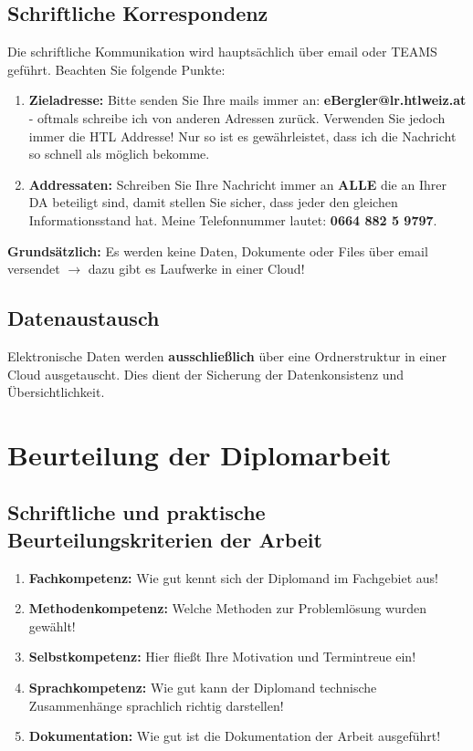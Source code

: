 \documentclass[a4paper, 12pt, xcolor=dvipsnames]{scrartcl}	%
\begin{document}
\subsection{Schriftliche Korrespondenz}								%
Die schriftliche Kommunikation wird hauptsächlich über email oder TEAMS geführt. Beachten Sie folgende Punkte:
\begin{enumerate}																%
\item\textbf{Zieladresse:} Bitte senden Sie Ihre mails immer an: \textbf{eBergler@lr.htlweiz.at} - oftmals schreibe ich von anderen Adressen zurück. Verwenden Sie jedoch immer die HTL Addresse! Nur so ist es gewährleistet, dass ich die Nachricht so schnell als möglich bekomme.
\item\textbf{Addressaten:} Schreiben Sie Ihre Nachricht immer an \textbf{ALLE} die an Ihrer DA beteiligt sind, damit stellen Sie sicher, dass jeder den gleichen Informationsstand hat. Meine Telefonnummer lautet: \textbf{0664 882 5 9797}.
\end{enumerate}
\textbf{Grundsätzlich:} Es werden keine Daten, Dokumente oder Files über email versendet $\to$ dazu gibt es Laufwerke in einer Cloud!\\
 

\subsection{Datenaustausch}													%
Elektronische Daten werden \textbf{ausschließlich} über eine Ordnerstruktur in einer Cloud ausgetauscht. Dies dient der Sicherung der Datenkonsistenz und Übersichtlichkeit. 

\section{Beurteilung der Diplomarbeit}										%
\subsection{Schriftliche und praktische Beurteilungskriterien der Arbeit}	%
\begin{enumerate}																	%
	\item\textbf{Fachkompetenz:} Wie gut kennt sich der Diplomand im Fachgebiet aus!
	\item\textbf{Methodenkompetenz:} Welche Methoden zur Problemlösung wurden gewählt!
	\item\textbf{Selbstkompetenz:} Hier fließt Ihre Motivation und Termintreue ein!
	\item\textbf{Sprachkompetenz:} Wie gut kann der Diplomand technische Zusammenhänge sprachlich richtig darstellen!
	\item\textbf{Dokumentation:} Wie gut ist die Dokumentation der Arbeit ausgeführt!
\end{enumerate}
\end{document}
